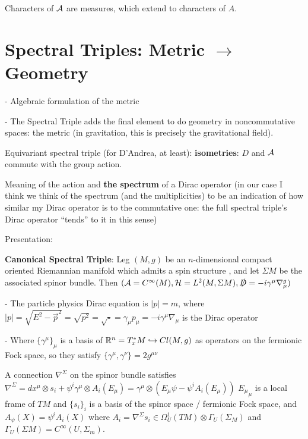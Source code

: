 Characters of $\mathcal A$ are measures, which extend to characters of $A$.

\section{Spectral Triples: Metric $\to$ Geometry}

 - Algebraic formulation of the metric

 - The Spectral Triple adds the final element to do geometry in noncommutative spaces: the metric (in gravitation, this is precisely the gravitational field).
 
 Equivariant spectral triple (for D'Andrea, at least): \textbf{isometries}: $D$ and $\mathcal A$ commute with the group action.

Meaning of the action and \textbf{the spectrum} of a Dirac operator (in our case I think we think of the spectrum (and the multiplicities) to be an indication of how similar my Dirac operator is to the commutative one: the full spectral triple's Dirac operator ``tends'' to it in this sense)

Presentation:
    
    \textbf{Canonical Spectral Triple}: Leg $(M, g)$ be an $n$-dimensional compact oriented Riemannian manifold which admits a spin structure%
    , and let $\Sigma M$ %
    be the associated spinor bundle. Then $(\mathcal A = C^\infty(M), \mathcal H = L^2(M, \Sigma M), \slashed D = -i \gamma^\mu \nabla^g_\mu)$%
    
        \quad - The particle physics Dirac equation is $|p| = m$, where $|p| = \sqrt{E^2 - \vec p^2} = \sqrt{p^2} = \sqrt{\square} = \gamma_\mu p_\mu = -i \gamma^\mu \nabla_\mu$ is the Dirac operator
        
        \quad - Where $\{\gamma^\mu\}_\mu$ is a basis of $\mathbb{R}^n = T^*_x M \hookrightarrow Cl(M, g)$ as operators on the fermionic Fock space, so they satisfy $\{\gamma^\mu, \gamma^\nu\} = 2 g^{\mu \nu}$
        
        \quad A connection $\nabla^\Sigma$ on the spinor bundle satisfies $\nabla^\Sigma = dx^\mu \otimes s_i + \psi^i \gamma^\mu \otimes A_i(E_\mu) = \gamma^\mu \otimes (E_\mu \psi - \psi^i A_i(E_\mu))$   ${E_\mu}_\mu$ is a local frame of $T M$ and $\{s_i\}_i$ is a basis of the spinor space / fermionic Fock space, and $A_\psi(X) = \psi^i A_i(X)$ where $A_i = \nabla^\Sigma s_i \in \Omega_U^1(TM) \otimes \Gamma_U(\Sigma_M)$ and $\Gamma_U(\Sigma M) = C^\infty(U, \Sigma_m)$.
    

